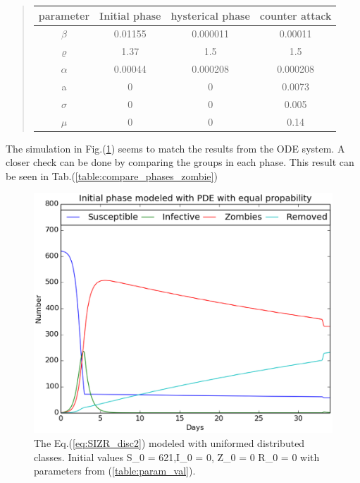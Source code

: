 \documentclass[%
twoside,                 %
final,                   %
10pt]{article}
\begin{document}
\label{table:param_val}

\begin{quote}
\begin{tabular}{cccc}
\hline
\multicolumn{1}{c}{ parameter } & \multicolumn{1}{c}{ Initial phase } & \multicolumn{1}{c}{ hysterical phase } & \multicolumn{1}{c}{ counter attack } \\
\hline
$\beta$          & 0.01155          & 0.000011         & 0.00011          \\
$\varrho$        & 1.37             & 1.5              & 1.5              \\
$\alpha$         & 0.00044          & 0.000208         & 0.000208         \\
a                & 0                & 0                & 0.0073           \\
$\sigma$         & 0                & 0                & 0.005            \\
$\mu$            & 0                & 0                & 0.14             \\
\hline
\end{tabular}
\end{quote}

\noindent
The simulation in Fig.(\ref{fig:zombie_three_number}) seems to match the results from the ODE system. A closer check can be done by comparing the groups in each phase. This result can be seen in Tab.(\ref{table:compare_phases_zombie}) 


\begin{figure}[ht]
  \centerline{\includegraphics[width=0.8\linewidth]{plots/2D_zombie_three_phases_number.eps}}
  \caption{
  \label{fig:zombie_three_number} The Eq.(\ref{eq:SIZR_disc2}) modeled with uniformed distributed classes. Initial values S_0 = 621,I_0 = 0, Z_0 = 0 R_0 = 0 with parameters from (\ref{table:param_val}).
  }
\end{figure}
\end{document}
